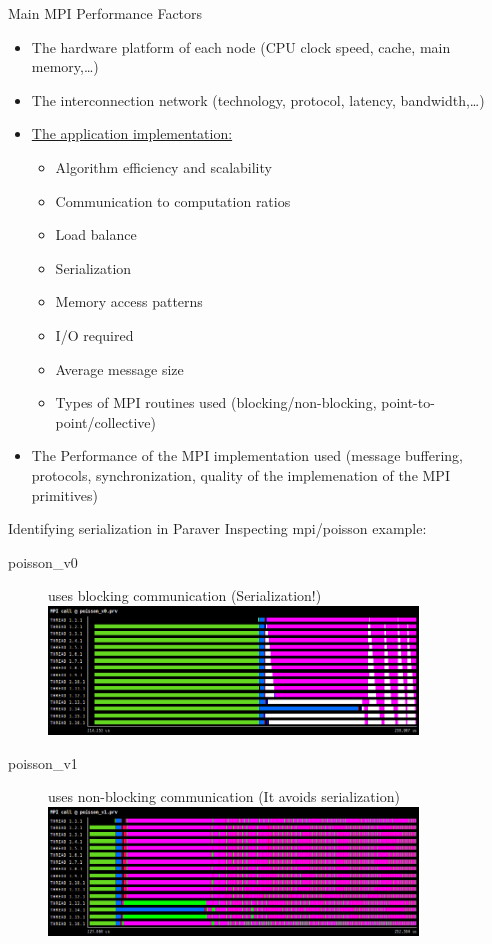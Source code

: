 \documentclass[10pt,xcolor=table]{beamer}
\begin{document}
\begin{frame}{Main MPI Performance Factors}
\begin{itemize}
    \item The hardware platform of each node (CPU clock speed, cache, main memory,\ldots)
    \item The interconnection network (technology, protocol, latency, bandwidth,\ldots)
    \item \underline{The application implementation:}
        \begin{itemize}
            \item Algorithm efficiency and scalability
            \item Communication to computation ratios
            \item Load balance
            \item Serialization
            \item Memory access patterns
            \item I/O required
            \item Average message size
            \item Types of MPI routines used (blocking/non-blocking, point-to-point/collective)            
        \end{itemize}
    \item  The Performance of the MPI implementation used (message buffering, protocols, synchronization, quality of the implemenation of the MPI primitives)
\end{itemize}
    
\end{frame}

\begin{frame}{Identifying serialization in Paraver}
Inspecting mpi/poisson example:

\begin{description}
\item[poisson\_v0] uses blocking communication (Serialization!)
\includegraphics[width=0.8\textwidth]{figs/MPI_call@poisson_v0.png}
\item[poisson\_v1] uses non-blocking communication (It avoids serialization)
\includegraphics[width=0.8\textwidth]{figs/MPI_call@poisson_v1.png}
\end{description}
    
\end{frame}
\end{document}
